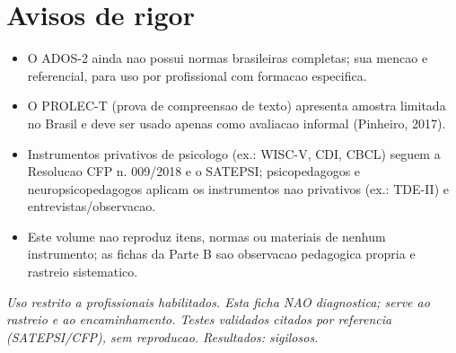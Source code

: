 \documentclass[a4paper,11pt]{book}
\newcommand{\avisolegal}{\par\medskip\noindent\footnotesize\itshape
\color{cinza}Uso restrito a profissionais habilitados. Esta ficha NAO diagnostica;
serve ao rastreio e ao encaminhamento. Testes validados citados por referencia
(SATEPSI/CFP), sem reproducao. Resultados: sigilosos.\color{black}\par}
\begin{document}
\section*{Avisos de rigor}
\begin{itemize}
\item O ADOS-2 ainda nao possui normas brasileiras completas; sua mencao e
referencial, para uso por profissional com formacao especifica.
\item O PROLEC-T (prova de compreensao de texto) apresenta amostra limitada no
Brasil e deve ser usado apenas como avaliacao informal (Pinheiro, 2017).
\item Instrumentos privativos de psicologo (ex.: WISC-V, CDI, CBCL) seguem a
Resolucao CFP n. 009/2018 e o SATEPSI; psicopedagogos e neuropsicopedagogos
aplicam os instrumentos nao privativos (ex.: TDE-II) e entrevistas/observacao.
\item Este volume nao reproduz itens, normas ou materiais de nenhum instrumento;
as fichas da Parte B sao observacao pedagogica propria e rastreio sistematico.
\end{itemize}

\avisolegal


\backmatter
\end{document}
